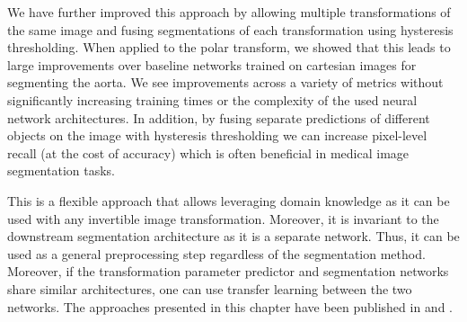 We have further improved this approach by allowing multiple transformations of the same image and fusing segmentations of each transformation using hysteresis thresholding. When applied to the polar transform, we showed that this leads to large improvements over baseline networks trained on cartesian images for segmenting the aorta. We see improvements across a variety of metrics without significantly increasing training times or the complexity of the used neural network architectures. In addition, by fusing separate predictions of different objects on the image with hysteresis thresholding we can increase pixel-level recall (at the cost of accuracy) which is often beneficial in medical image segmentation tasks. 

This is a flexible approach that allows leveraging domain knowledge as it can be used with any invertible image transformation. Moreover, it is invariant to the downstream segmentation architecture as it is a separate network. Thus, it can be used as a general preprocessing step regardless of the segmentation method. Moreover, if the transformation parameter predictor and segmentation networks share similar architectures, one can use transfer learning between the two networks. The approaches presented in this chapter have been published in \cite{bencevicTrainingPolarImage2021} and \cite{bencevicUsingPolarTransform2022a}.

